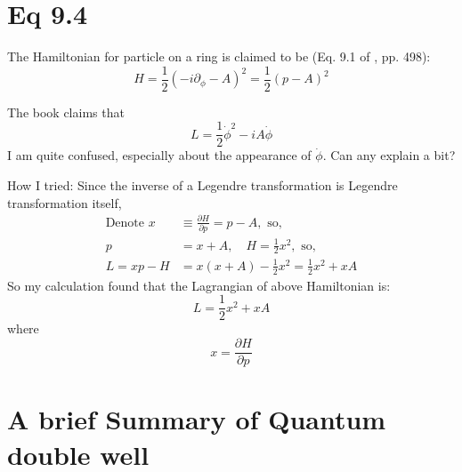 \documentclass{article}
\begin{document}
\section{Eq 9.4}

The Hamiltonian for particle on a ring is claimed to be (Eq. 9.1 of
\cite{Altland2010}, pp. 498):
\begin{equation}
    H = \frac{1}{2}(-i\partial_\phi -A)^2 = \frac{1}{2}(p-A)^2
\end{equation}

The book \cite{Altland2010} claims that 
\begin{equation}
    L = \frac{1}{2}\dot{\phi}^2 - iA \dot{\phi}
\end{equation}
I am quite confused, especially about the appearance of $\dot{\phi}$. Can any explain
a bit?

How I tried: Since the inverse of a Legendre transformation is Legendre
transformation itself, 
\begin{align}
    \text{Denote }x &\equiv \frac{\partial H}{\partial p} = p-A,\text{ so,} \\
    p &= x + A,\quad H = \frac{1}{2}x^2 ,\text{ so,}\\
    L = x p - H &= x(x+A) - \frac{1}{2}x^2 = \frac{1}{2}x^2 + x A 
\end{align}
So my calculation found that the Lagrangian of above Hamiltonian is:
\begin{equation}
    L = \frac{1}{2}x^2 + x A
\end{equation}
where
\begin{equation}
    x = \frac{\partial H}{\partial p}
\end{equation}


\section{A brief Summary of Quantum double well}
\end{document}
